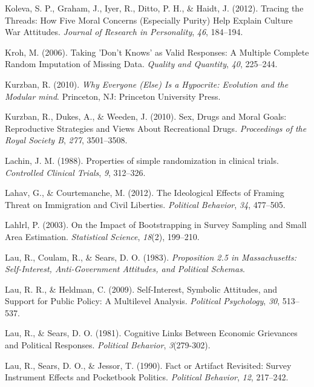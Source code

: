 \documentclass[12pt,econ]{sources/authesis}
\begin{document}
\leavevmode\hypertarget{ref-koleva_2012_tracing}{}%
Koleva, S. P., Graham, J., Iyer, R., Ditto, P. H., \& Haidt, J. (2012). Tracing the Threads: How Five Moral Concerns (Especially Purity) Help Explain Culture War Attitudes. \emph{Journal of Research in Personality}, \emph{46}, 184--194.

\leavevmode\hypertarget{ref-kroh_2006_taking}{}%
Kroh, M. (2006). Taking 'Don't Knows' as Valid Responses: A Multiple Complete Random Imputation of Missing Data. \emph{Quality and Quantity}, \emph{40}, 225--244.

\leavevmode\hypertarget{ref-kurzban_2010_everyone}{}%
Kurzban, R. (2010). \emph{Why Everyone (Else) Is a Hypocrite: Evolution and the Modular mind}. Princeton, NJ: Princeton University Press.

\leavevmode\hypertarget{ref-kurzban_2010_sex}{}%
Kurzban, R., Dukes, A., \& Weeden, J. (2010). Sex, Drugs and Moral Goals: Reproductive Strategies and Views About Recreational Drugs. \emph{Proceedings of the Royal Society B}, \emph{277}, 3501--3508.

\leavevmode\hypertarget{ref-lachin_1988_properties}{}%
Lachin, J. M. (1988). Properties of simple randomization in clinical trials. \emph{Controlled Clinical Trials}, \emph{9}, 312--326.

\leavevmode\hypertarget{ref-lahav_ideological_2012}{}%
Lahav, G., \& Courtemanche, M. (2012). The Ideological Effects of Framing Threat on Immigration and Civil Liberties. \emph{Political Behavior}, \emph{34}, 477--505.

\leavevmode\hypertarget{ref-lahlrl_2003_impact}{}%
Lahlrl, P. (2003). On the Impact of Bootstrapping in Survey Sampling and Small Area Estimation. \emph{Statistical Science}, \emph{18}(2), 199--210.

\leavevmode\hypertarget{ref-lau_proposition_1983}{}%
Lau, R., Coulam, R., \& Sears, D. O. (1983). \emph{Proposition 2.5 in Massachusetts: Self-Interest, Anti-Government Attitudes, and Political Schemas}.

\leavevmode\hypertarget{ref-lau_2030_self-interest}{}%
Lau, R. R., \& Heldman, C. (2009). Self-Interest, Symbolic Attitudes, and Support for Public Policy: A Multilevel Analysis. \emph{Political Psychology}, \emph{30}, 513--537.

\leavevmode\hypertarget{ref-lau_cognitive_1981}{}%
Lau, R., \& Sears, D. O. (1981). Cognitive Links Between Economic Grievances and Political Responses. \emph{Political Behavior}, \emph{3}(279-302).

\leavevmode\hypertarget{ref-lau_fact_1990}{}%
Lau, R., Sears, D. O., \& Jessor, T. (1990). Fact or Artifact Revisited: Survey Instrument Effects and Pocketbook Politics. \emph{Political Behavior}, \emph{12}, 217--242.
\end{document}
